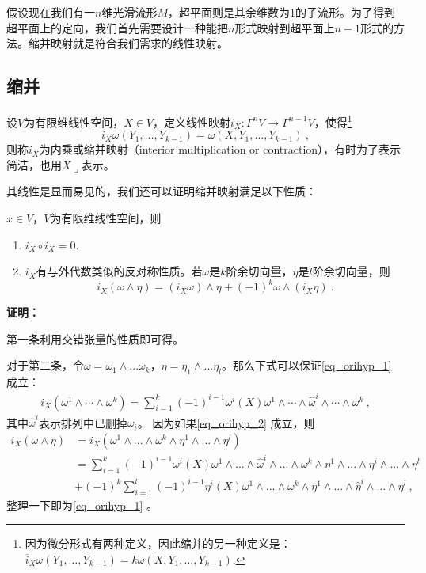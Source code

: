 

假设现在我们有一$n$维光滑流形$M$，超平面则是其余维数为1的子流形。为了得到超平面上的定向，我们首先需要设计一种能把$n$形式映射到超平面上$n-1$形式的方法。缩并映射就是符合我们需求的线性映射。
\subsection{缩并}
\begin{definition}{}
设$V$为有限维线性空间，$X\in V$，定义线性映射$i_X:\Gamma^n V\rightarrow\Gamma^{n-1}V$，使得\footnote{因为微分形式有两种定义，因此缩并的另一种定义是：$\overline{i}_X\omega(Y_1,\ldots,Y_{k-1})=k\omega(X,Y_1,\ldots,Y_{k-1}).$}
\begin{equation}
i_X\omega(Y_1,\ldots,Y_{k-1})=\omega(X,Y_1,\ldots,Y_{k-1})~,
\end{equation}
则称$i_X$为内乘或缩并映射（interior multiplication or contraction），有时为了表示简洁，也用$X\lrcorner$表示。
\end{definition}
其线性是显而易见的，我们还可以证明缩并映射满足以下性质：
\begin{lemma}{}
$x\in V$，$V$为有限维线性空间，则
\begin{enumerate}
\item $i_X\circ i_X=0$.
\item $i_X$有与外代数类似的反对称性质。若$\omega$是$k$阶余切向量，$\eta$是$l$阶余切向量，则
\begin{equation}\label{eq_orihyp_1}
i_X(\omega\wedge\eta)=(i_X\omega)\wedge\eta+(-1)^k\omega\wedge(i_X\eta)~.
\end{equation}
\end{enumerate}
\end{lemma}
\textbf{证明：}

第一条利用交错张量的性质即可得。

对于第二条，令$\omega=\omega_1\wedge...\omega_k$，$\eta=\eta_1\wedge...\eta_l$。那么下式可以保证\autoref{eq_orihyp_1} 成立：
\begin{equation}\label{eq_orihyp_2}
\begin{aligned}
i_X(\omega^1\wedge\cdots\wedge\omega^k)=\sum_{i=1}^k(-1)^{i-1}\omega^i(X)\omega^1\wedge\cdots\wedge\hat{\omega}^i\wedge\cdots\wedge\omega^k~,
\end{aligned}
\end{equation}
其中$\hat\omega^i$表示排列中已删掉$\omega_i$。
因为如果\autoref{eq_orihyp_2} 成立，则
\begin{equation}
\begin{aligned}
i_X(\omega\wedge\eta)&=i_X(\omega^1\wedge...\wedge\omega^k\wedge\eta^1\wedge...\wedge\eta^l)\\
&=\sum_{i=1}^k(-1)^{i-1}\omega^{i}(X)\omega^1\wedge...\wedge\hat\omega^i\wedge...\wedge\omega^k\wedge\eta^1\wedge...\wedge\eta^i\wedge...\wedge\eta^l\\
&+(-1)^k\sum_{i=1}^l(-1)^{i-1}\eta^{i}(X)\omega^1\wedge...\wedge\omega^k\wedge\eta^1\wedge...\wedge\hat\eta^i\wedge...\wedge\eta^l~,
\end{aligned}
\end{equation}
整理一下即为\autoref{eq_orihyp_1} 。

